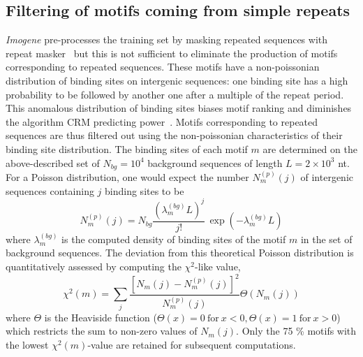 \documentclass[a4,center,fleqn]{NAR}
\begin{document}
\subsection*{Filtering of motifs coming from simple repeats}
{\em Imogene} pre-processes the training set by masking repeated sequences with
repeat masker~\cite{bao2002automated} but this is not sufficient to eliminate
the production of motifs corresponding to repeated sequences.
These motifs have a non-poissonian distribution of binding sites on intergenic
sequences: one binding site has a high probability to be followed by another
one after a multiple of the repeat period.
This anomalous distribution of binding sites biases motif ranking and 
diminishes the algorithm CRM predicting power~\cite{Rouault:2010fk}. 
Motifs corresponding to repeated sequences are thus filtered out using the
non-poissonian characteristics of their binding site distribution.
The binding sites of each motif $m$ are determined on the above-described set
of $N_{bg}=10^4$ background sequences of length $L=2 \times 10^3$ nt.
For a Poisson distribution, one would expect the number $N^{(p)}_m(j)$ of
intergenic sequences containing $j$ binding sites to be
\begin{equation}
N^{(p)}_m(j)=N_{bg} \frac{(\lambda^{(bg)}_m L)^j}{j!}\,
\exp(- \lambda^{(bg)}_m L)
\label{npoi}
\end{equation}
where $\lambda^{(bg)}_m$ is the computed density of binding sites of the motif
$m$ in the set of background sequences.
The deviation from this theoretical Poisson distribution is quantitatively
assessed by computing the $\chi^2$-like value,
\begin{equation}
\chi^2(m)= \sum_j \frac{[N_m(j)-N^{(p)}_m(j)]^2}{N^{(p)}_m(j)}
\Theta(N_m(j))
\end{equation}
where  $\Theta$ is the Heaviside function ($\Theta(x)=0\ \mathrm{for}\ x<0,\Theta(x)=1\ \mathrm{for}\  x>0 $) which restricts the sum to non-zero values of $N_m(j)$. Only the 75 \%
motifs with the lowest $\chi^2(m)$-value
are retained for subsequent computations.
\end{document}
